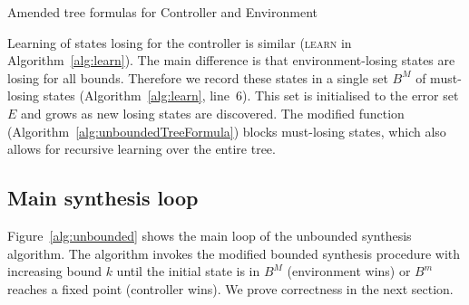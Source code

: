 \begin{algorithm}[t] \caption{Amended tree formulas for Controller and
    Environment} \label{alg:unboundedTreeFormula} \begin{algorithmic}[1]
          \State
         \Else \State {} \EndIf
        \EndFunction {} \end{algorithmic}

    \begin{algorithmic}[1]
        \State {}
        \Else
        \State {}
        \EndIf
        \EndFunction
    \end{algorithmic}
\end{algorithm}

Learning of states losing for the controller is similar (\textsc{learn} in Algorithm~\ref{alg:learn}). The main difference is that environment-losing states are losing for all bounds. Therefore we record these states in a single set $B^M$ of must-losing states (Algorithm~\ref{alg:learn}, line~6).  This set is initialised to the error set $E$ and grows as new losing states are discovered.  The modified \textsc{} function (Algorithm~\ref{alg:unboundedTreeFormula}) blocks must-losing states, which also allows for recursive learning over the entire tree.

\subsection{Main synthesis loop}

Figure~\ref{alg:unbounded} shows the main loop of the unbounded synthesis algorithm.
The algorithm invokes the modified bounded synthesis procedure with increasing bound $k$
until the initial state is in $B^M$ (environment wins) or $B^m$ reaches a fixed point 
(controller wins). We prove correctness in the next section.

